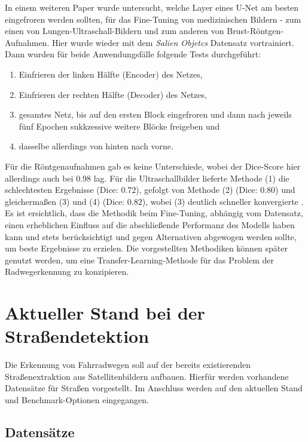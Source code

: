 In einem weiteren Paper wurde untersucht, welche Layer eines U-Net am besten eingefroren werden sollten, für das Fine-Tuning von medizinischen Bildern - 
zum einen von Lungen-Ultraschall-Bildern und zum anderen von Brust-Röntgen-Aufnahmen. 
Hier wurde wieder mit dem \textit{Salien Objetcs} Datensatz vortrainiert. Dann wurden für beide Anwendungsfälle folgende Tests durchgeführt: 
\begin{enumerate}
	\item Einfrieren der linken Hälfte (Encoder) des Netzes,
	\item Einfrieren der rechten Hälfte (Decoder) des Netzes,
	\item gesamtes Netz, bis auf den ersten Block eingefroren und dann nach jeweils fünf Epochen sukkzessive weitere Blöcke freigeben und
	\item dasselbe allerdings von hinten nach vorne.
\end{enumerate}
Für die Röntgenaufnahmen gab es keine Unterschiede, wobei der Dice-Score hier allerdings auch bei $0.98$ lag. 
Für die Ultraschallbilder lieferte Methode (1) die schlechtesten Ergebnisse (Dice: $0.72$), gefolgt von Methode (2) (Dice: $0.80$) 
und gleichermaßen (3) und (4) (Dice: $0.82$), wobei (3) deutlich schneller konvergierte \cite{Amiri.19.02.2020}. \\ 
Es ist ersichtlich, dass die Methodik beim Fine-Tuning, abhängig vom Datensatz, einen erheblichen Einfluss 
auf die abschließende Performanz des Modells haben kann und stets berücksichtigt und gegen Alternativen abgewogen werden sollte,
um beste Ergebnisse zu erzielen. Die vorgestellten Methodiken können später genutzt werden, 
um eine Transfer-Learning-Methode für das Problem der Radwegerkennung zu konzipieren. 


\section{Aktueller Stand bei der Straßendetektion}

Die Erkennung von Fahrradwegen soll auf der bereits existierenden Straßenextraktion aus Satellitenbildern aufbauen.
Hierfür werden vorhandene Datensätze für Straßen vorgestellt. 
Im Anschluss werden auf den aktuellen Stand und Benchmark-Optionen eingegangen.

\subsection{Datensätze} \label{sec:road-detection:roads-data}

